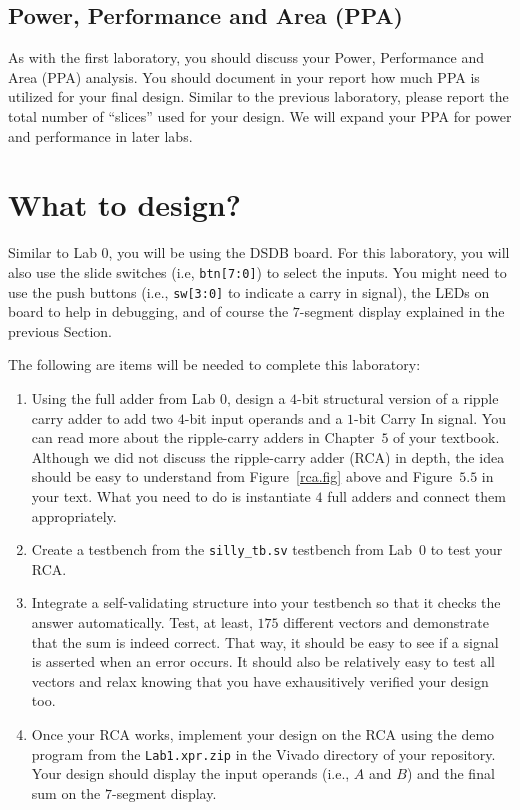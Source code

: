 \documentclass{article}
\begin{document}
\subsection{Power, Performance and Area (PPA)}

As with the first laboratory, you should discuss your
Power, Performance and Area (PPA)
analysis.  You should document in your report how much PPA is utilized
for your final design.  Similar to the previous laboratory, please report
the total number of ``slices'' used for your design.  We will expand
your PPA for power and performance in later labs.

\section{What to design?}

Similar to Lab 0, you will be using the DSDB board.
For this laboratory, you will also use the slide switches (i.e,
\verb!btn[7:0]!) to select the
inputs.  You might need to use the push buttons (i.e., \verb!sw[3:0]!
to indicate a carry in signal), the LEDs on board to help in
debugging, and of course the $7$-segment display
explained in the previous Section.

The following are items will be needed to complete this laboratory:
\begin{enumerate}
  \item Using the full adder from Lab 0, design a $4$-bit structural
    version of a ripple carry
    adder to add two $4$-bit input operands and a $1$-bit Carry In
    signal.  You can read more about the ripple-carry adders in
    Chapter~$5$ of your textbook.  Although we did not discuss the
    ripple-carry adder (RCA) in depth,
    the idea should be easy to understand from
    Figure~\ref{rca.fig} above and Figure~$5.5$ in your text.  What
    you need to do is instantiate $4$ full adders and connect them
    appropriately.  
    \item Create a testbench from the \verb!silly_tb.sv! testbench from
      Lab~$0$ to test your RCA.  
    \item Integrate a self-validating structure into your testbench so
      that it checks the answer automatically.  Test, at least, $175$
      different vectors and demonstrate that the sum is indeed
      correct.  That way, it
      should be easy to see if a signal is asserted when an error
      occurs.
      It should also be relatively easy to test all vectors and
      relax knowing that you have exhausitively verified your design too.
    \item Once your RCA works, implement your design on the RCA
      using the demo program from the \verb!Lab1.xpr.zip! in the Vivado
      directory of your repository.  Your design should
      display the input operands (i.e., $A$ and $B$) and the final
      sum on the $7$-segment display.
\end{enumerate}
\end{document}
